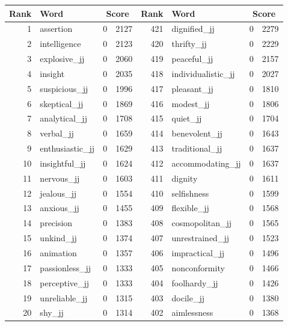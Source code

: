 \begin{table}[tbp]
    \begin{tabular}{| rlr@{.}l | rlr@{.}l |}
    \hline
    \textbf{Rank} & \textbf{Word} & \multicolumn{2}{c|}{\textbf{Score}} & \textbf{Rank} & \textbf{Word} & \multicolumn{2}{c|}{\textbf{Score}} \\
    \hline
    1 & assertion & 0 & 2127    &    421 & dignified\_jj & 0 & 2279 \\
    2 & intelligence & 0 & 2123    &    420 & thrifty\_jj & 0 & 2229 \\
    3 & explosive\_jj & 0 & 2060    &    419 & peaceful\_jj & 0 & 2157 \\
    4 & insight & 0 & 2035    &    418 & individualistic\_jj & 0 & 2027 \\
    5 & suspicious\_jj & 0 & 1996    &    417 & pleasant\_jj & 0 & 1810 \\
    6 & skeptical\_jj & 0 & 1869    &    416 & modest\_jj & 0 & 1806 \\
    7 & analytical\_jj & 0 & 1708    &    415 & quiet\_jj & 0 & 1704 \\
    8 & verbal\_jj & 0 & 1659    &    414 & benevolent\_jj & 0 & 1643 \\
    9 & enthusiastic\_jj & 0 & 1629    &    413 & traditional\_jj & 0 & 1637 \\
    10 & insightful\_jj & 0 & 1624    &    412 & accommodating\_jj & 0 & 1637 \\
    11 & nervous\_jj & 0 & 1603    &    411 & dignity & 0 & 1611 \\
    12 & jealous\_jj & 0 & 1554    &    410 & selfishness & 0 & 1599 \\
    13 & anxious\_jj & 0 & 1455    &    409 & flexible\_jj & 0 & 1568 \\
    14 & precision & 0 & 1383    &    408 & cosmopolitan\_jj & 0 & 1565 \\
    15 & unkind\_jj & 0 & 1374    &    407 & unrestrained\_jj & 0 & 1523 \\
    16 & animation & 0 & 1357    &    406 & impractical\_jj & 0 & 1496 \\
    17 & passionless\_jj & 0 & 1333    &    405 & nonconformity & 0 & 1466 \\
    18 & perceptive\_jj & 0 & 1333    &    404 & foolhardy\_jj & 0 & 1426 \\
    19 & unreliable\_jj & 0 & 1315    &    403 & docile\_jj & 0 & 1380 \\
    20 & shy\_jj & 0 & 1314    &    402 & aimlessness & 0 & 1368 \\

\end{tabular}
\end{table}
